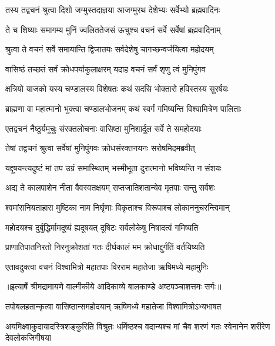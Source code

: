 \twolineshloka
{तस्य तद्वचनं श्रुत्वा दिशो जग्मुस्तदाज्ञया}
{आजग्मुरथ देशेभ्यः सर्वेभ्यो ब्रह्मवादिनः} %

\twolineshloka
{ते च शिष्याः समागम्य मुनिं ज्वलिततेजसं}
{ऊचुश्च वचनं सर्वे सर्वेषां ब्रह्मवादिनाम्} %

\twolineshloka
{श्रुत्वा ते वचनं सर्वे समायान्ति द्विजातयः}
{सर्वदेशेषु चागच्छन्वर्जयित्वा महोदयम्} %

\twolineshloka
{वासिष्ठं तच्छतं सर्वं क्रोधपर्याकुलाक्षरम्}
{यदाह वचनं सर्वं शृणु त्वं मुनिपुंगव} %

\twolineshloka
{क्षत्रियो याजको यस्य चण्डालस्य विशेषतः}
{कथं सदसि भोक्तारो हविस्तस्य सुरर्षयः} %

\twolineshloka
{ब्राह्मणा वा महात्मानो भुक्त्वा चण्डालभोजनम्}
{कथं स्वर्गं गमिष्यन्ति विश्वामित्रेण पालिताः} %

\twolineshloka
{एतद्वचनं नैष्ठुर्यमूचुः संरक्तलोचनाः}
{वासिष्ठा मुनिशार्दूल सर्वे ते समहोदयाः} %

\twolineshloka
{तेषां तद्वचनं श्रुत्वा सर्वेषां मुनिपुंगवः}
{क्रोधसंरक्तनयनः सरोषमिदमब्रवीत्} %

\twolineshloka
{यद्दूषयन्त्यदुष्टं मां तप उग्रं समास्थितम्}
{भस्मीभूता दुरात्मानो भविष्यन्ति न संशयः} %

\twolineshloka
{अद्य ते कालपाशेन नीता वैवस्वतक्षयम्}
{सप्तजातिशतान्येव मृतपाः सन्तु सर्वशः} %

\twolineshloka
{श्वमांसनियताहारा मुष्टिका नाम निर्घृणाः}
{विकृताश्च विरूपाश्च लोकाननुचरन्त्विमान्} %

\twolineshloka
{महोदयश्च दुर्बुद्धिर्मामदूष्यं ह्यदूषयत्}
{दूषिटः सर्वलोकेषु निषादत्वं गमिष्यति} %

\twolineshloka
{प्राणातिपातनिरतो निरनुक्रोशतां गतः}
{दीर्घकालं मम क्रोधाद्दुर्गतिं वर्तयिष्यति} %

\twolineshloka
{एतावदुक्त्वा वचनं विश्वामित्रो महातपाः}
{विरराम महातेजा ऋषिमध्ये महामुनिः} %


{॥इत्यार्षे श्रीमद्रामायणे वाल्मीकीये आदिकाव्ये बालकाण्डे अष्टपञ्चाशत्तमः सर्गः॥}


\twolineshloka
{तपोबलहतान्कृत्वा वासिष्ठान्समहोदयान्}
{ऋषिमध्ये महातेजा विश्वामित्रोऽभ्यभाषत} %

\threelineshloka
{अयमिक्ष्वाकुदायादस्त्रिशङ्कुरिति विश्रुतः}
{धर्मिष्ठश्च वदान्यश्च मां चैव शरणं गतः}
{स्वेनानेन शरीरेण देवलोकजिगीषया} %

